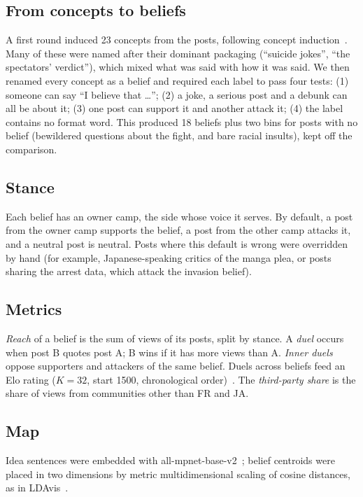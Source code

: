 \documentclass[10pt,a4paper]{article}
\begin{document}
\subsection{From concepts to beliefs}
A first round induced 23 concepts from the posts, following concept induction~\cite{lloom,topicgpt}. Many of these were named after their dominant packaging (``suicide jokes'', ``the spectators' verdict''), which mixed what was said with how it was said. We then renamed every concept as a belief and required each label to pass four tests: (1) someone can say ``I believe that \ldots''; (2) a joke, a serious post and a debunk can all be about it; (3) one post can support it and another attack it; (4) the label contains no format word. This produced 18 beliefs plus two bins for posts with no belief (bewildered questions about the fight, and bare racial insults), kept off the comparison.

\subsection{Stance}
Each belief has an owner camp, the side whose voice it serves. By default, a post from the owner camp supports the belief, a post from the other camp attacks it, and a neutral post is neutral. Posts where this default is wrong were overridden by hand (for example, Japanese-speaking critics of the manga plea, or posts sharing the arrest data, which attack the invasion belief).

\subsection{Metrics}
\emph{Reach} of a belief is the sum of views of its posts, split by stance. A \emph{duel} occurs when post B quotes post A; B wins if it has more views than A. \emph{Inner duels} oppose supporters and attackers of the same belief. Duels across beliefs feed an Elo rating ($K = 32$, start 1500, chronological order)~\cite{elo}. The \emph{third-party share} is the share of views from communities other than FR and JA.

\subsection{Map}
Idea sentences were embedded with all-mpnet-base-v2~\cite{sbert}; belief centroids were placed in two dimensions by metric multidimensional scaling of cosine distances, as in LDAvis~\cite{ldavis}.
\end{document}
